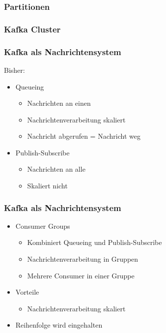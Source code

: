 \begin{frame}
\frametitle{Partitionen}

\end{frame}

\begin{frame}
\frametitle{Kafka Cluster}

\end{frame}



\begin{frame}
\frametitle{Kafka als Nachrichtensystem}

Bisher: 
\begin{itemize}
	\item Queueing
	\begin{itemize}
		\item Nachrichten an einen
		\item Nachrichtenverarbeitung skaliert
		\item Nachricht abgerufen = Nachricht weg
	\end{itemize}
	\item Publish-Subscribe
	\begin{itemize}
		\item Nachrichten an alle
		\item Skaliert nicht  			%
	\end{itemize}
\end{itemize}

\end{frame}

\begin{frame}
\frametitle{Kafka als Nachrichtensystem}

\begin{itemize}
	\item Consumer Groups
	\begin{itemize}
		\item Kombiniert Queueing und Publish-Subscribe
		\item Nachrichtenverarbeitung in Gruppen
		\item Mehrere Consumer in einer Gruppe
	\end{itemize}
	\item Vorteile
	\begin{itemize}
		\item Nachrichtenverarbeitung skaliert %
	\end{itemize}
	\item Reihenfolge wird eingehalten 
\end{itemize}

\end{frame}


